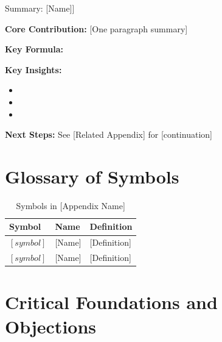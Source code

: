 \begin{tcolorbox}[colback=gray!5!white, colframe=gray!75!black, 
    title=Appendix [CODE] Summary: [Name]]

\textbf{Core Contribution:}
[One paragraph summary]

\textbf{Key Formula:}
\begin{equation}
[Most important equation]
\end{equation}

\textbf{Key Insights:}
\begin{itemize}[nosep]
\item [Insight 1]
\item [Insight 2]
\item [Insight 3]
\end{itemize}

\textbf{Next Steps:} See [Related Appendix] for [continuation]
\end{tcolorbox}


\section{Glossary of Symbols}
\label{sec:[code]-glossary}

\begin{table}[htbp]
\centering
\caption{Symbols in [Appendix Name]}
\label{tab:[code]-symbols}
\renewcommand{\arraystretch}{1.3}
\begin{tabular}{@{}lll@{}}
\toprule
\textbf{Symbol} & \textbf{Name} & \textbf{Definition} \\
\midrule
$[symbol]$ & [Name] & [Definition] \\
$[symbol]$ & [Name] & [Definition] \\
\bottomrule
\end{tabular}
\end{table}


\section{Critical Foundations and Objections}
\label{sec:[code]-critical}


